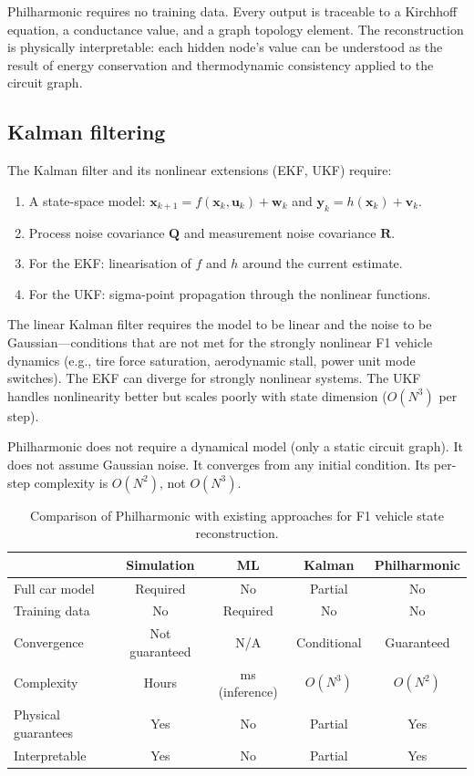 \documentclass[twocolumn,10pt,a4paper]{article}
\theoremstyle{definition}
\theoremstyle{remark}
\newcommand{\vect}[1]{\boldsymbol{#1}}
\newcommand{\mat}[1]{\mathbf{#1}}
\begin{document}
Philharmonic requires no training data. Every output is traceable to a Kirchhoff equation, a conductance value, and a graph topology element. The reconstruction is physically interpretable: each hidden node's value can be understood as the result of energy conservation and thermodynamic consistency applied to the circuit graph.

\subsection{Kalman filtering}

The Kalman filter \citep{Kalman1960} and its nonlinear extensions (EKF, UKF) require:
\begin{enumerate}
    \item A state-space model: $\vect{x}_{k+1} = f(\vect{x}_k, \vect{u}_k) + \vect{w}_k$ and $\vect{y}_k = h(\vect{x}_k) + \vect{v}_k$.
    \item Process noise covariance $\mat{Q}$ and measurement noise covariance $\mat{R}$.
    \item For the EKF: linearisation of $f$ and $h$ around the current estimate.
    \item For the UKF: sigma-point propagation through the nonlinear functions.
\end{enumerate}

The linear Kalman filter requires the model to be linear and the noise to be Gaussian---conditions that are not met for the strongly nonlinear F1 vehicle dynamics (e.g., tire force saturation, aerodynamic stall, power unit mode switches). The EKF can diverge for strongly nonlinear systems. The UKF handles nonlinearity better but scales poorly with state dimension ($O(N^3)$ per step).

Philharmonic does not require a dynamical model (only a static circuit graph). It does not assume Gaussian noise. It converges from any initial condition. Its per-step complexity is $O(N^2)$, not $O(N^3)$.

\begin{table}[!htbp]
\centering
\caption{Comparison of Philharmonic with existing approaches for F1 vehicle state reconstruction.}
\label{tab:comparison}
\begin{tabular}{@{}lcccc@{}}
\toprule
 & Simulation & ML & Kalman & Philharmonic \\
\midrule
Full car model & Required & No & Partial & No \\
Training data & No & Required & No & No \\
Convergence & Not guaranteed & N/A & Conditional & Guaranteed \\
Complexity & Hours & ms (inference) & $O(N^3)$ & $O(N^2)$ \\
Physical guarantees & Yes & No & Partial & Yes \\
Interpretable & Yes & No & Partial & Yes \\
\bottomrule
\end{tabular}
\end{table}
\end{document}
